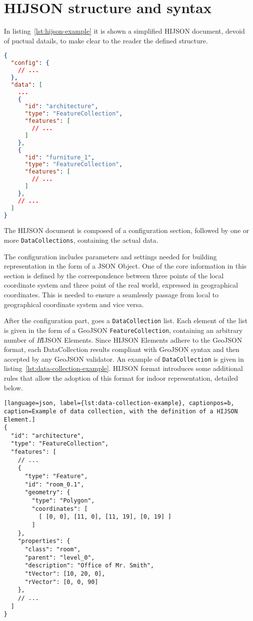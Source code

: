 
\section{HIJSON structure and syntax}\label{hijson-syntax}

In listing~\ref{lst:hijson-example} it is shown a simplified HIJSON document, devoid of puctual datails, to make clear to the reader the defined structure.

\begin{lstlisting}[language=json, label={lst:hijson-example}, captionpos=b, caption=Example of HIJSON document.]
{
  "config": {
    // ...
  },
  "data": [
    ...
    {
      "id": "architecture",
      "type": "FeatureCollection",
      "features": [
        // ...
      ] 
    },
    {
      "id": "furniture_1",
      "type": "FeatureCollection",
      "features": [
        // ...
      ] 
    },
    // ...
  ]
}
\end{lstlisting}


The HIJSON document is composed of a configuration section, followed by one or more {\tt DataCollections}, containing the actual data.

The configuration includes parameters and settings needed for building representation in the form of a JSON Object. One of the core information in this section is defined by the correspondence between three points of the local coordinate system and three point of the real world, expressed in geographical coordinates. This is needed to ensure a seamlessly passage from local to geographical coordinate system and vice versa.

After the configuration part, goes a {\tt DataCollection} list. Each element of the list is given in the form of a GeoJSON {\tt FeatureCollection}, containing an arbitrary 
number of {\emph HIJSON Elements}. Since  HIJSON Elements adhere to the GeoJSON
format, each DataCollection results compliant with GeoJSON syntax and then accepted by any GeoJSON validator. An example of {\tt DataCollection} is given in listing~\ref{lst:data-collection-example}. HIJSON format introduces some additional rules that allow the adoption of this
format for indoor representation, detailed below.

\begin{lstlisting}[language=json, label={lst:data-collection-example}, captionpos=b, caption=Example of data collection, with the definition of a HIJSON Element.]
{
  "id": "architecture",
  "type": "FeatureCollection",
  "features": [
    // ...
    {
      "type": "Feature",
      "id": "room_0.1",
      "geometry": {
        "type": "Polygon",
        "coordinates": [ 
          [ [0, 0], [11, 0], [11, 19], [0, 19] ]
        ]
    },
    "properties": {
      "class": "room",
      "parent": "level_0",
      "description": "Office of Mr. Smith",
      "tVector": [10, 20, 0],
      "rVector": [0, 0, 90]
    },
    // ...
  ]
}
\end{lstlisting}

